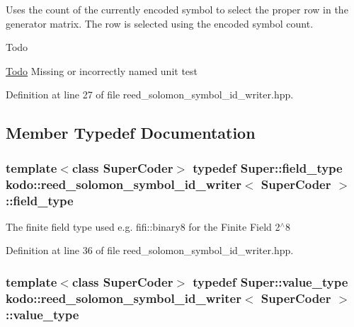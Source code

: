 Uses the count of the currently encoded symbol to select the proper row in the generator matrix. The row is selected using the encoded symbol count. 

\begin{DoxyRefDesc}{Todo}
\item[\hyperlink{todo__todo000046}{Todo}]Missing or incorrectly named unit test\end{DoxyRefDesc}


Definition at line 27 of file reed\-\_\-solomon\-\_\-symbol\-\_\-id\-\_\-writer.\-hpp.



\subsection{Member Typedef Documentation}
\hypertarget{classkodo_1_1reed__solomon__symbol__id__writer_ac87679f574c25276e40aec8fe4b941a3}{
\subsubsection[{field\-\_\-type}]{\setlength{\rightskip}{0pt plus 5cm}template$<$class Super\-Coder$>$ typedef {\bf Super\-::field\-\_\-type} {\bf kodo\-::reed\-\_\-solomon\-\_\-symbol\-\_\-id\-\_\-writer}$<$ Super\-Coder $>$\-::{\bf field\-\_\-type}}}\label{classkodo_1_1reed__solomon__symbol__id__writer_ac87679f574c25276e40aec8fe4b941a3}




The finite field type used e.\-g. fifi\-::binary8 for the Finite Field 2$^\wedge$8 

Definition at line 36 of file reed\-\_\-solomon\-\_\-symbol\-\_\-id\-\_\-writer.\-hpp.

\hypertarget{classkodo_1_1reed__solomon__symbol__id__writer_ad37b24364f156ca0cca7dcf41d1cbeb1}{
\subsubsection[{value\-\_\-type}]{\setlength{\rightskip}{0pt plus 5cm}template$<$class Super\-Coder$>$ typedef {\bf Super\-::value\-\_\-type} {\bf kodo\-::reed\-\_\-solomon\-\_\-symbol\-\_\-id\-\_\-writer}$<$ Super\-Coder $>$\-::{\bf value\-\_\-type}}}\label{classkodo_1_1reed__solomon__symbol__id__writer_ad37b24364f156ca0cca7dcf41d1cbeb1}




